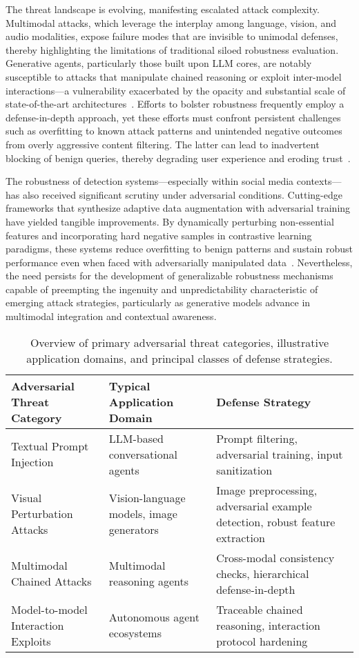 The threat landscape is evolving, manifesting escalated attack complexity. Multimodal attacks, which leverage the interplay among language, vision, and audio modalities, expose failure modes that are invisible to unimodal defenses, thereby highlighting the limitations of traditional siloed robustness evaluation. Generative agents, particularly those built upon LLM cores, are notably susceptible to attacks that manipulate chained reasoning or exploit inter-model interactions—a vulnerability exacerbated by the opacity and substantial scale of state-of-the-art architectures~\cite{ref85}. Efforts to bolster robustness frequently employ a defense-in-depth approach, yet these efforts must confront persistent challenges such as overfitting to known attack patterns and unintended negative outcomes from overly aggressive content filtering. The latter can lead to inadvertent blocking of benign queries, thereby degrading user experience and eroding trust~\cite{ref67}.

The robustness of detection systems—especially within social media contexts—has also received significant scrutiny under adversarial conditions. Cutting-edge frameworks that synthesize adaptive data augmentation with adversarial training have yielded tangible improvements. By dynamically perturbing non-essential features and incorporating hard negative samples in contrastive learning paradigms, these systems reduce overfitting to benign patterns and sustain robust performance even when faced with adversarially manipulated data~\cite{ref67}. Nevertheless, the need persists for the development of generalizable robustness mechanisms capable of preempting the ingenuity and unpredictability characteristic of emerging attack strategies, particularly as generative models advance in multimodal integration and contextual awareness.

\begin{table*}[htbp]
\centering
\caption{Overview of primary adversarial threat categories, illustrative application domains, and principal classes of defense strategies.}
\label{tab:threat_types}
\begin{adjustbox}{max width=\textwidth}
\begin{tabular}{lll}
\toprule
\textbf{Adversarial Threat Category} & \textbf{Typical Application Domain} & \textbf{Defense Strategy} \\
\midrule
Textual Prompt Injection & LLM-based conversational agents & Prompt filtering, adversarial training, input sanitization \\
Visual Perturbation Attacks & Vision-language models, image generators & Image preprocessing, adversarial example detection, robust feature extraction \\
Multimodal Chained Attacks & Multimodal reasoning agents & Cross-modal consistency checks, hierarchical defense-in-depth \\
Model-to-model Interaction Exploits & Autonomous agent ecosystems & Traceable chained reasoning, interaction protocol hardening \\
\bottomrule
\end{tabular}
\end{adjustbox}
\end{table*}

